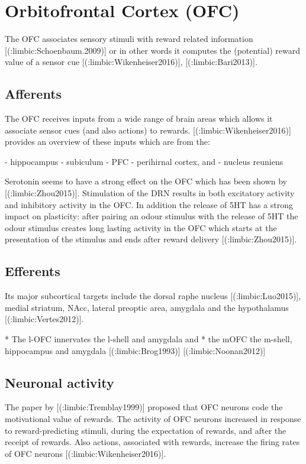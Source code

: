 {{\section{Orbitofrontal Cortex (OFC)}

The OFC associates sensory stimuli with reward related information [(:limbic:Schoenbaum.2009)] or in other words it computes the (potential) reward value of a sensor cue [(:limbic:Wikenheiser2016)], [(:limbic:Bari2013)].

\subsection{Afferents}

The OFC receives inputs from a wide range of brain areas which allows it associate sensor cues (and also actions) to rewards. [(:limbic:Wikenheiser2016)] provides an overview of these inputs which are from the:

  - hippocampus
  - subiculum
  - PFC
  - perihirnal cortex, and
  - nucleus reuniens

Serotonin seems to have a strong effect on the OFC which has been shown by [(:limbic:Zhou2015)]. Stimulation of the DRN results in both excitatory activity and inhibitory activity in the OFC. In addition the release of 5HT has a strong impact on plasticity: after pairing an odour stimulus with the release of 5HT the odour stimulus creates long lasting activity in the OFC which starts at the presentation of the stimulus and ends after reward delivery  [(:limbic:Zhou2015)].

\subsection{Efferents}

Its major subcortical targets include the dorsal raphe nucleus [(:limbic:Luo2015)], medial striatum, NAcc, lateral preoptic area, amygdala and the hypothalamus [(:limbic:Vertes2012)].

  * The l-OFC innervates the l-shell and amygdala and 
  * the mOFC the m-shell, hippocampus and amygdala [(:limbic:Brog1993)] [(:limbic:Noonan2012)]

\subsection{Neuronal activity}

The paper by [(:limbic:Tremblay1999)] proposed that OFC neurons code the motivational value of rewards. The activity of OFC neurons increased in response to reward-predicting stimuli, during the expectation of rewards, and after the receipt of rewards. Also actions, associated with rewards, increase the firing rates of OFC neurons [(:limbic:Wikenheiser2016)].

}}
